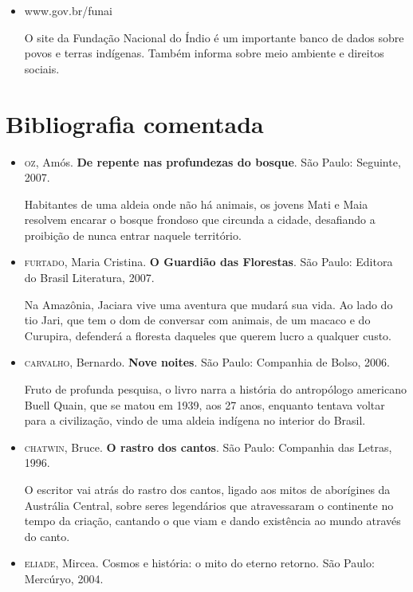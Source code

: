 \documentclass[12pt]{extarticle}
\begin{document}
\begin{itemize}
\item www.gov.br/funai

O site da Fundação Nacional do Índio é um importante banco de dados
sobre povos e terras indígenas. Também informa sobre meio ambiente e
direitos sociais.
\end{itemize}

\section{Bibliografia comentada}




\begin{itemize}

\item\textsc{oz}, Amós. \textbf{De repente nas profundezas do bosque}. São Paulo:
Seguinte, 2007.

Habitantes de uma aldeia onde não há animais, os jovens Mati e Maia
resolvem encarar o bosque frondoso que circunda a cidade, desafiando a
proibição de nunca entrar naquele território.

\item\textsc{furtado}, Maria Cristina. \textbf{O Guardião das Florestas}. São Paulo:
Editora do Brasil Literatura, 2007.

Na Amazônia, Jaciara vive uma aventura que mudará sua vida. Ao lado do
tio Jari, que tem o dom de conversar com animais, de um macaco e do
Curupira, defenderá a floresta daqueles que querem lucro a qualquer
custo.

\item\textsc{carvalho}, Bernardo. \textbf{Nove noites}. São Paulo: Companhia de Bolso, 2006.

Fruto de profunda pesquisa, o livro narra a história do antropólogo
americano Buell Quain, que se matou em 1939, aos 27 anos, enquanto
tentava voltar para a civilização, vindo de uma aldeia indígena no
interior do Brasil.

\item\textsc{chatwin}, Bruce. \textbf{O rastro dos cantos}. São Paulo: Companhia das
Letras, 1996.

O escritor vai atrás do rastro dos cantos, ligado aos mitos de
aborígines da Austrália Central, sobre seres legendários que
atravessaram o continente no tempo da criação, cantando o que viam e
dando existência ao mundo através do canto.


\item\textsc{eliade}, Mircea. Cosmos e história: o mito do eterno retorno. São Paulo: Mercúryo, 2004.


\end{itemize}
\end{document}
